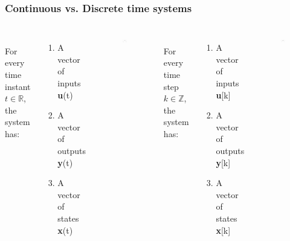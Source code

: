 \begin{frame}
	\frametitle{Continuous vs. Discrete time systems}
	\vspace{-2ex}
	\begin{columns}[c] 
		
		\\
		For every time instant $t \in \mathds{R}$, the system has: 
		\begin{enumerate}
			\item A vector of inputs \textbf{u}(t)
			\item A vector of outputs \textbf{y}(t)
			\item A vector of states \textbf{x}(t)
		\end{enumerate}
		\begin{figure}
			\includegraphics[width=0.8\linewidth]{continuous}
		\end{figure}
		
		\\
		For every time step $k \in \mathds{Z}$, the system has: 
		\begin{enumerate}
			\item A vector of inputs \textbf{u}[k]
			\item A vector of outputs \textbf{y}[k]
			\item A vector of states \textbf{x}[k]
		\end{enumerate}
		\begin{figure}
			\includegraphics[width=0.8\linewidth]{discrete}
		\end{figure}
		
	\end{columns}
\end{frame}

